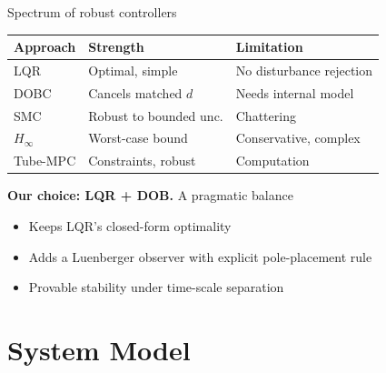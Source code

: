\documentclass[10pt,aspectratio=169]{beamer}
\begin{document}
\begin{frame}{Spectrum of robust controllers}
  \begin{center}\small
  \begin{tabular}{lll}
    \toprule
    Approach & Strength & Limitation\\
    \midrule
    LQR \cite{kanayama1990}        & Optimal, simple   & No disturbance rejection\\
    DOBC \cite{ohnishi1996,chen2016}& Cancels matched $d$ & Needs internal model\\
    SMC \cite{utkin2009}           & Robust to bounded unc. & Chattering\\
    $H_\infty$ \cite{zhou1996}     & Worst-case bound  & Conservative, complex\\
    Tube-MPC \cite{mayne2005}      & Constraints, robust & Computation\\
    \bottomrule
  \end{tabular}
  \end{center}

  \vspace{0.6em}
  \textbf{Our choice: LQR + DOB.} A pragmatic balance
  \begin{itemize}
    \item Keeps LQR's closed-form optimality
    \item Adds a Luenberger observer with explicit pole-placement rule
    \item Provable stability under time-scale separation
  \end{itemize}
\end{frame}

\section{System Model}
\end{document}

